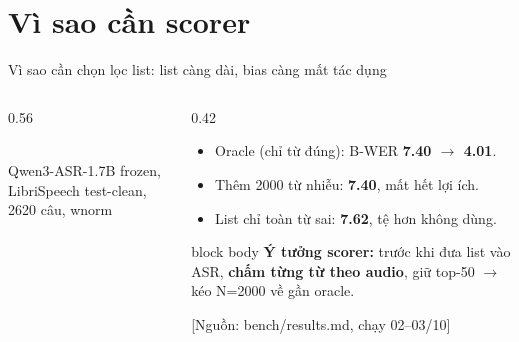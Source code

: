 \documentclass[aspectratio=169,xcolor=table]{beamer}
\newcommand{\bad}[1]{\textcolor{RiskRed}{\textbf{#1}}}
\newcommand{\good}[1]{\textcolor{GoodGreen}{\textbf{#1}}}
\newcommand{\src}[1]{{\tiny\color{TextGray}[Nguồn: #1]}}
\begin{document}
\section{Vì sao cần scorer}
\begin{frame}{Vì sao cần chọn lọc list: list càng dài, bias càng mất tác dụng}
\begin{columns}[T]
\begin{column}{0.56\textwidth}
\centering
{}\\
{\scriptsize Qwen3-ASR-1.7B frozen, LibriSpeech test-clean, 2620 câu, wnorm}
\end{column}
\begin{column}{0.42\textwidth}
\small
\begin{itemize}\itemsep4pt
\item Oracle (chỉ từ đúng): B-WER \good{7.40 $\rightarrow$ 4.01}.
\item Thêm 2000 từ nhiễu: \bad{7.40}, mất hết lợi ích.
\item List chỉ toàn từ sai: \bad{7.62}, tệ hơn không dùng.
\end{itemize}
\vspace{0.2cm}
\begin{beamercolorbox}[sep=0.5em,rounded=true]{block body}
\footnotesize\textbf{Ý tưởng scorer:} trước khi đưa list vào ASR, \textbf{chấm từng từ theo audio}, giữ top-50 $\rightarrow$ kéo N=2000 về gần oracle.
\end{beamercolorbox}
\vspace{0.1cm}
\src{bench/results.md, chạy 02--03/10}
\end{column}
\end{columns}
\end{frame}
\end{document}
